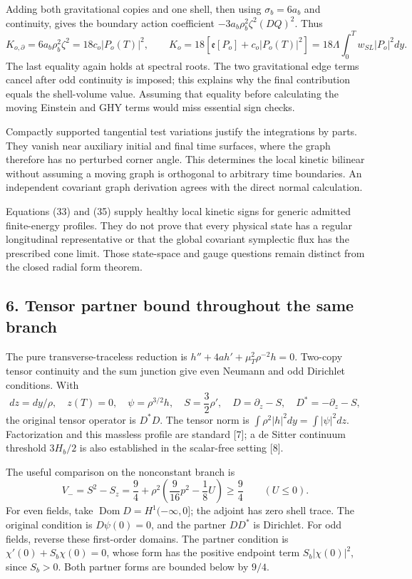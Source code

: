 \documentclass[
  11pt,
]{article}
\begin{document}
Adding both gravitational copies and one shell, then using
\(\sigma_b=6a_b\) and continuity, gives the boundary action coefficient
\(-3a_b\rho_b^2\zeta^2(DQ)^2\). Thus \[
 K_{o,\partial}=6a_b\rho_b^2\zeta^2
               =18c_o|P_o(T)|^2,\qquad
 \boxed{K_o=18[{\mathfrak e}[P_o]+c_o|P_o(T)|^2]
             =18\Lambda\int_0^T w_{SL}|P_o|^2dy.}
 \tag{35}
\] The last equality again holds at spectral roots. The two
gravitational edge terms cancel after odd continuity is imposed; this
explains why the final contribution equals the shell-volume value.
Assuming that equality before calculating the moving Einstein and GHY
terms would miss essential sign checks.

Compactly supported tangential test variations justify the integrations
by parts. They vanish near auxiliary initial and final time surfaces,
where the graph therefore has no perturbed corner angle. This determines
the local kinetic bilinear without assuming a moving graph is orthogonal
to arbitrary time boundaries. An independent covariant graph derivation
agrees with the direct normal calculation.

Equations (33) and (35) supply healthy local kinetic signs for generic
admitted finite-energy profiles. They do not prove that every physical
state has a regular longitudinal representative or that the global
covariant symplectic flux has the prescribed cone limit. Those
state-space and gauge questions remain distinct from the closed radial
form theorem.

\subsection{6. Tensor partner bound throughout the same
branch}\label{tensor-partner-bound-throughout-the-same-branch}

The pure transverse-traceless reduction is
\(h''+4ah'+\mu_T^2\rho^{-2}h=0\). Two-copy tensor continuity and the sum
junction give even Neumann and odd Dirichlet conditions. With \[
 dz=dy/\rho,\quad z(T)=0,\quad
 \psi=\rho^{3/2}h,\quad S=\frac32\rho',\quad
 D=\partial_z-S,\quad D^*=-\partial_z-S,
 \tag{36}
\] the original tensor operator is \(D^*D\). The tensor norm is
\(\int\rho^2|h|^2dy=\int|\psi|^2dz\). Factorization and this massless
profile are standard {[}7{]}; a de Sitter continuum threshold \(3H_b/2\)
is also established in the scalar-free setting {[}8{]}.

The useful comparison on the nonconstant branch is \[
 V_-=S^2-S_z
 =\frac94+\rho^2\left(\frac9{16}p^2-\frac18U\right)
 \ge\frac94\qquad(U\le0).                              \tag{37}
\] For even fields, take \(\operatorname{Dom}D=H^1(-\infty,0]\); the
adjoint has zero shell trace. The original condition is \(D\psi(0)=0\),
and the partner \(DD^*\) is Dirichlet. For odd fields, reverse these
first-order domains. The partner condition is \(\chi'(0)+S_b\chi(0)=0\),
whose form has the positive endpoint term \(S_b|\chi(0)|^2\), since
\(S_b>0\). Both partner forms are bounded below by \(9/4\).
\end{document}
